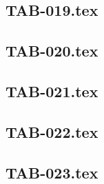 \renewcommand{\xxexo}{TAB-019.tex} 
\subsection*{\xxexo} 
\graphicspath{{../../exos/tableaux/TAB-019/}}
 
 
\renewcommand{\xxexo}{TAB-020.tex} 
\subsection*{\xxexo} 
\graphicspath{{../../exos/tableaux/TAB-020/}}
 
 
\renewcommand{\xxexo}{TAB-021.tex} 
\subsection*{\xxexo} 
\graphicspath{{../../exos/tableaux/TAB-021/}}
 
 
\renewcommand{\xxexo}{TAB-022.tex} 
\subsection*{\xxexo} 
\graphicspath{{../../exos/tableaux/TAB-022/}}
 
 
\renewcommand{\xxexo}{TAB-023.tex} 
\subsection*{\xxexo} 
\graphicspath{{../../exos/tableaux/TAB-023/}}
 
 
